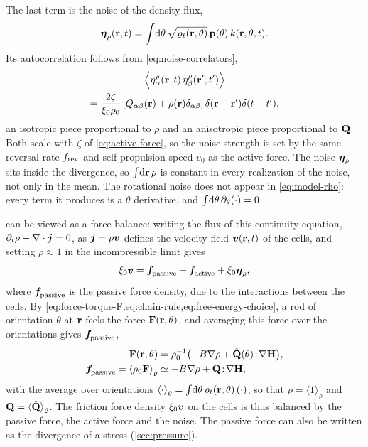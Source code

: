 \documentclass[aps,pre,reprint,superscriptaddress,longbibliography,nofootinbib
]{revtex4-2}
\begin{document}
The last term is the noise of the density flux,
\begin{equation}
  \label{eq:eta-rho-def}
  \boldsymbol\eta_{\rho}(\mathbf{r},t) = \int\!\mathrm{d}\theta\,\sqrt{\varrho_t(\mathbf{r},\theta)}\,
  \mathbf{p}(\theta)\,k(\mathbf{r},\theta,t).
\end{equation}
Its autocorrelation follows from
\cref{eq:noise-correlators},
\begin{multline}
  \label{eq:eta-rho-autocorrelation}
  \left\langle \eta^{\rho}_\alpha(\mathbf{r},t) \,\eta^{\rho}_\beta(\mathbf{r}',t') \right\rangle
  \\
  =
  \frac{2\zeta}{\xi_0\rho_0}
  \left[Q_{\alpha\beta}(\mathbf{r})+\rho(\mathbf{r}) \delta_{\alpha\beta}\right]
 \delta(\mathbf{r}-\mathbf{r}')\delta(t-t') ,
\end{multline}
an isotropic piece proportional to $\rho$ and an
anisotropic piece proportional to $\mathbf{Q}$. Both scale with
$\zeta$ of \cref{eq:active-force}, so the noise strength is
set by the same reversal rate $f_{\rm rev}$ and self-propulsion
speed $v_0$ as the active force. The noise $\boldsymbol\eta_{\rho}$
sits inside the divergence, so $\int\!\mathrm{d}\mathbf{r}\,\rho$ is
constant in every realization of the noise, not only in the
mean. The rotational noise does not appear in
\cref{eq:model-rho}: every term it produces is a $\theta$
derivative, and $\int\!\mathrm{d}\theta\,\partial_\theta(\cdot)=0$.

 can be viewed as a force balance:
writing the flux of this continuity equation,
$\partial_t\rho+\nabla\cdot\boldsymbol j=0$, as $\boldsymbol j=\rho\boldsymbol{v}$
defines the velocity field $\boldsymbol{v}(\mathbf{r},t)$ of the cells, and
setting $\rho\approx1$ in the incompressible limit gives
\begin{align}
  \label{eq:velocity}
  \xi_0 \boldsymbol{v} = \boldsymbol{f}_\text{\!passive} + \boldsymbol{f}_\text{\!active} + \xi_0 \boldsymbol\eta_{\rho},
\end{align}
where $\boldsymbol{f}_\text{\!passive}$ is the passive force density, due to the
interactions between the cells. By
\cref{eq:force-torque-F,eq:chain-rule,eq:free-energy-choice},
a rod of orientation $\theta$ at $\mathbf{r}$ feels the force
$\mathbf{F}(\mathbf{r},\theta)$, and averaging this force over the
orientations gives $\boldsymbol{f}_\text{\!passive}$,
\begin{align}
  \mathbf{F}(\mathbf{r},\theta) &= \rho_0^{-1}\bigl(-B\nabla\rho + \hat{\mathbf{Q}}(\theta)\!:\!\nabla\mathbf{H}\bigr),
  \label{eq:force-on-cells}
  \\
  \boldsymbol{f}_\text{\!passive} = \left\langle \rho_0 \mathbf{F} \right\rangle_\varrho &\simeq -B\nabla\rho + \mathbf{Q}\!:\!\nabla\mathbf{H} ,
  \label{eq:passive-force}
\end{align}
with the average over orientations $\langle \cdot
\rangle_\varrho =
\int\!\mathrm{d}\theta\,\varrho_t(\mathbf{r},\theta)\,(\cdot)$, so that
$\rho=\langle 1 \rangle_\varrho$ and $\mathbf{Q}=\langle \hat{\mathbf{Q}}
\rangle_\varrho$. The friction force density $\xi_0\boldsymbol{v}$ on
the cells is thus balanced by the passive force, the active
force and the noise. The passive force can also be written
as the divergence of a stress (\cref{sec:pressure}).
\end{document}
